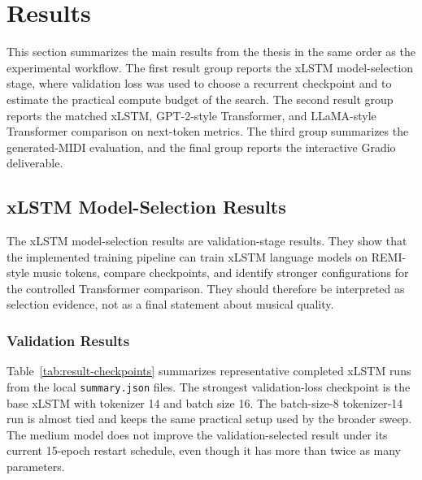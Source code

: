\section{Results}

This section summarizes the main results from the thesis in the same order as
the experimental workflow. The first result group reports the xLSTM
model-selection stage, where validation loss was used to choose a recurrent
checkpoint and to estimate the practical compute budget of the search. The
second result group reports the matched xLSTM, GPT-2-style Transformer, and
LLaMA-style Transformer comparison on next-token metrics. The third group
summarizes the generated-MIDI evaluation, and the final group reports the
interactive Gradio deliverable.

\subsection{xLSTM Model-Selection Results}

The xLSTM model-selection results are validation-stage results. They show that
the implemented training pipeline can train xLSTM language models on REMI-style
music tokens, compare checkpoints, and identify stronger configurations for the
controlled Transformer comparison. They should therefore be interpreted as
selection evidence, not as a final statement about musical quality.

\subsubsection{Validation Results}

Table~\ref{tab:result-checkpoints} summarizes representative completed xLSTM
runs from the local \verb|summary.json| files. The strongest validation-loss
checkpoint is the base xLSTM with tokenizer 14 and batch size 16. The
batch-size-8 tokenizer-14 run is almost tied and keeps the same practical setup
used by the broader sweep. The medium model does not improve the
validation-selected result under its current 15-epoch restart schedule, even
though it has more than twice as many parameters.

